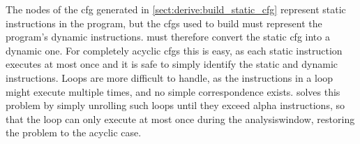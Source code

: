 The nodes of the \gls{cfg} generated in
\autoref{sect:derive:build_static_cfg} represent static instructions
in the program, but the \glspl{cfg} used to build {\StateMachines}
must represent the program's dynamic instructions.  {\Technique} must
therefore convert the static \gls{cfg} into a dynamic one.  For
completely acyclic \glspl{cfg} this is easy, as each static
instruction executes at most once and it is safe to simply identify
the static and dynamic instructions.  Loops are more difficult to
handle, as the instructions in a loop might execute multiple times,
and no simple correspondence exists.  {\Technique} solves this problem
by simply unrolling such loops until they exceed \gls{alpha}
instructions, so that the
loop can only execute at most once during the \gls{analysiswindow},
restoring the problem to the acyclic case.

